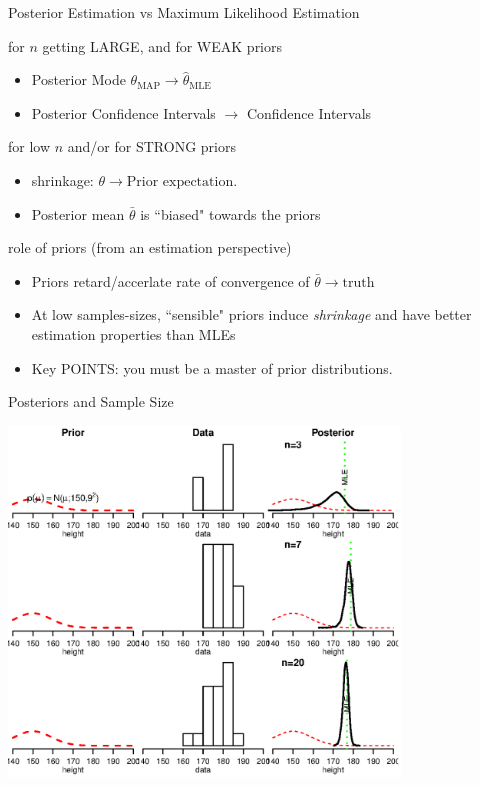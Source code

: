 \documentclass[presentation,9pt,xcolor=dvipsnames]{beamer}
\begin{document}
\begin{frame}[label={sec:orge782ced}]{Posterior Estimation vs Maximum Likelihood Estimation}
\begin{block}{for \(n\) getting \alert{LARGE}, and for \alert{WEAK} priors}
\begin{itemize}
\item Posterior Mode \(\theta_{\text{MAP}}\rightarrow\hat{\theta}_{\text{MLE}}\)
\item Posterior Confidence Intervals \(\rightarrow\) Confidence Intervals
\end{itemize}
\end{block}
\begin{block}{for \alert{low} \(n\) and/or for \alert{STRONG} priors}
\begin{itemize}
\item shrinkage:  \(\theta\rightarrow\text{Prior expectation}\).
\item Posterior mean \(\bar{\theta}\) is ``biased" towards the priors
\end{itemize}
\end{block}
\begin{block}{role of priors (from an estimation perspective)}
\begin{itemize}
\item Priors retard/accerlate rate of convergence of \(\bar{\theta}\rightarrow\text{truth}\)
\item At low samples-sizes, ``sensible" priors induce \emph{shrinkage} and have better estimation properties than MLEs
\item \alert{Key POINTS}: you must be a master of prior distributions.
\end{itemize}
\end{block}
\end{frame}
\begin{frame}[label={sec:orge3471dd}]{Posteriors and Sample Size}
\begin{center}
\includegraphics[width=0.78\textwidth,height=0.78\textheight]{priorinfro.eps}
\end{center}
\end{frame}
\end{document}
